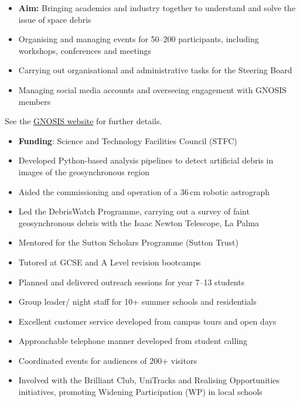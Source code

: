 \documentclass[10pt,a4paper]{altacv}
\begin{document}
\divider

\begin{itemize}
	\item \textbf{Aim:} Bringing academics and industry together to understand and solve the issue of space debris
	\item Organising and managing events for 50--200 participants, including workshops, conferences and meetings
	\item Carrying out organisational and administrative tasks for the Steering Board
	\item Managing social media accounts and overseeing engagement with GNOSIS members
\end{itemize}
\small See the \href{https://gnosisnetwork.org/}{GNOSIS website} for further details.

\divider

\begin{itemize}
	\item \textbf{Funding}: Science and Technology Facilities Council (STFC)
	\item Developed Python-based analysis pipelines to detect artificial debris in images of the geosynchronous region
	\item Aided the commissioning and operation of a 36\,cm robotic astrograph 
	\item Led the DebrisWatch Programme, carrying out a survey of faint geosynchronous debris with the Isaac Newton Telescope, La Palma
\end{itemize}

\divider

\begin{itemize}
	\item Mentored for the Sutton Scholars Programme (Sutton Trust)
	\item Tutored at GCSE and A Level revision bootcamps
	\item Planned and delivered outreach sessions for year 7--13 students
	\item Group leader/ night staff for 10+ summer schools and residentials
	\item Excellent customer service developed from campus tours and open days
	\item Approachable telephone manner developed from student calling
	\item Coordinated events for audiences of 200+ visitors
	\item Involved with the Brilliant Club, UniTracks and Realising Opportunities initiatives, promoting Widening Participation (WP) in local schools
\end{itemize}
\end{document}
